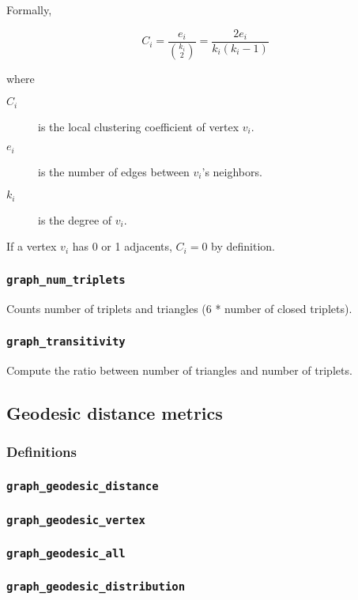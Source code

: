 Formally,

\begin{equation*}
 C_i = \frac{e_i}{\binom{k_i}{2}} = \frac{2 e_i}{k_i (k_i - 1)}
\end{equation*}

where

\begin{description}
 \item[$C_i$] is the local clustering coefficient of vertex $v_i$.
 \item[$e_i$] is the number of edges between $v_i$'s neighbors.
 \item[$k_i$] is the degree of $v_i$.
\end{description}

If a vertex $v_i$ has 0 or 1 adjacents, $C_i = 0$ by definition.
 
\subsubsection{\texttt{graph\_num\_triplets}}
Counts number of triplets and triangles (6 * number of closed triplets).
\subsubsection{\texttt{graph\_transitivity}}
Compute the ratio between number of triangles and number of triplets.

\subsection{Geodesic distance metrics}
\subsubsection{Definitions}
\subsubsection{\texttt{graph\_geodesic\_distance}}
\subsubsection{\texttt{graph\_geodesic\_vertex}}
\subsubsection{\texttt{graph\_geodesic\_all}}
\subsubsection{\texttt{graph\_geodesic\_distribution}}

